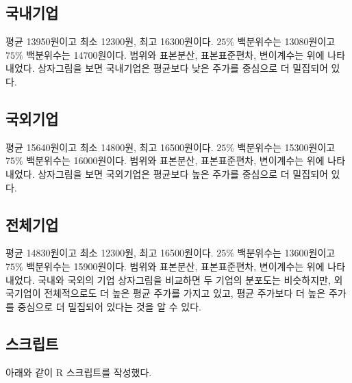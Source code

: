 \subsection{국내기업}

평균 13950원이고 최소 12300원, 최고 16300원이다.
$25\%$ 백분위수는 13080원이고 $75\%$ 백분위수는 14700원이다.
범위와 표본분산, 표본표준편차, 변이계수는 위에 나타내었다.
상자그림을 보면 국내기업은 평균보다 낮은 주가를 중심으로 더 밀집되어 있다.

\subsection{국외기업}

평균 15640원이고 최소 14800원, 최고 16500원이다.
$25\%$ 백분위수는 15300원이고 $75\%$ 백분위수는 16000원이다.
범위와 표본분산, 표본표준편차, 변이계수는 위에 나타내었다.
상자그림을 보면 국외기업은 평균보다 높은 주가를 중심으로 더 밀집되어 있다.

\subsection{전체기업}

평균 14830원이고 최소 12300원, 최고 16500원이다.
$25\%$ 백분위수는 13600원이고 $75\%$ 백분위수는 15900원이다.
범위와 표본분산, 표본표준편차, 변이계수는 위에 나타내었다.
국내와 국외의 기업 상자그림을 비교하면 두 기업의 분포도는 비슷하지만,
외국기업이 전체적으로도 더 높은 평균 주가를 가지고 있고, 평균 주가보다
더 높은 주가를 중심으로 더 밀집되어 있다는 것을 알 수 있다.


\subsection{스크립트}
아래와 같이 R 스크립트를 작성했다.

